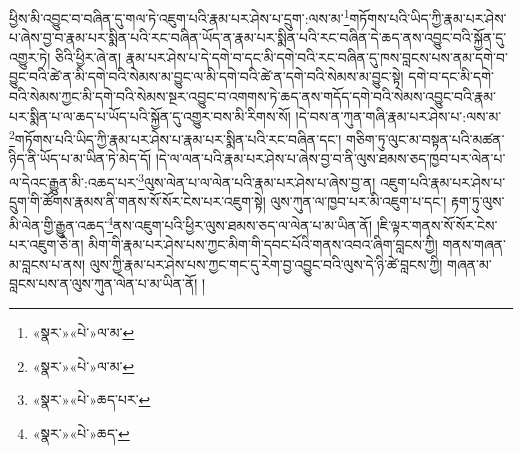 ཕྱིས་མི་འབྱུང་བ་བཞིན་དུ་གལ་ཏེ་འཇུག་པའི་རྣམ་པར་ཤེས་པ་དྲུག་:ལས་མ་\footnote{«སྣར་»«པེ་»ལ་མ་}གཏོགས་པའི་ཡིད་ཀྱི་རྣམ་པར་ཤེས་པ་ཞེས་བྱ་བ་རྣམ་པར་སྨིན་པའི་རང་བཞིན་ཡོད་ན་རྣམ་པར་སྨིན་པའི་རང་བཞིན་དེ་ཆད་ནས་འབྱུང་བའི་སྐྱོན་དུ་འགྱུར་ཏེ། ཅིའི་ཕྱིར་ཞེ་ན། རྣམ་པར་ཤེས་པ་དེ་དགེ་བ་དང་མི་དགེ་བའི་རང་བཞིན་དུ་ཁས་བླངས་པས་ནམ་དགེ་བ་བྱུང་བའི་ཚེ་ན་མི་དགེ་བའི་སེམས་མ་བྱུང་ལ་མི་དགེ་བའི་ཚེ་ན་དགེ་བའི་སེམས་མ་བྱུང་སྟེ། དགེ་བ་དང་མི་དགེ་བའི་སེམས་ཀྱང་མི་དགེ་བའི་སེམས་སྔར་འབྱུང་བ་འགགས་ཏེ་ཆད་ནས་གདོད་དགེ་བའི་སེམས་འབྱུང་བའི་རྣམ་པར་སྨིན་པ་ལ་ཆད་པ་ཡོད་པའི་སྐྱོན་དུ་འགྱུར་བས་མི་རིགས་སོ། །དེ་བས་ན་ཀུན་གཞི་རྣམ་པར་ཤེས་པ་:ལས་མ་\footnote{«སྣར་»«པེ་»ལ་མ་}གཏོགས་པའི་ཡིད་ཀྱི་རྣམ་པར་ཤེས་པ་རྣམ་པར་སྨིན་པའི་རང་བཞིན་དང་། གཅིག་ཏུ་ལུང་མ་བསྟན་པའི་མཚན་ཉིད་ནི་ཡོད་པ་མ་ཡིན་ཏེ་མེད་དོ། །དེ་ལ་ལན་པའི་རྣམ་པར་ཤེས་པ་ཞེས་བྱ་བ་ནི་ལུས་ཐམས་ཅད་ཁྱབ་པར་ལེན་པ་ལ་དེའང་རྒྱུན་མི་:འཆད་པར་\footnote{«སྣར་»«པེ་»ཆད་པར་}ལུས་ལེན་པ་ལ་ལེན་པའི་རྣམ་པར་ཤེས་པ་ཞེས་བྱ་ན། འཇུག་པའི་རྣམ་པར་ཤེས་པ་དྲུག་གི་ཚོགས་རྣམས་ནི་གནས་སོ་སོར་ངེས་པར་འཇུག་སྟེ། ལུས་ཀུན་ལ་ཁྱབ་པར་མི་འཇུག་པ་དང་། རྟག་ཏུ་ལུས་མི་ལེན་གྱི་རྒྱུན་འཆད་\footnote{«སྣར་»«པེ་»ཆད་}ནས་འཇུག་པའི་ཕྱིར་ལུས་ཐམས་ཅད་ལ་ལེན་པ་མ་ཡིན་ནོ། །ཇི་ལྟར་གནས་སོ་སོར་ངེས་པར་འཇུག་ཅེ་ན། མིག་གི་རྣམ་པར་ཤེས་པས་ཀྱང་མིག་གི་དབང་པོའི་གནས་འབའ་ཞིག་བླངས་ཀྱི། གནས་གཞན་མ་བླངས་པ་ནས། ལུས་ཀྱི་རྣམ་པར་ཤེས་པས་ཀྱང་གང་དུ་རེག་བྱ་འབྱུང་བའི་ལུས་དེ་ཉི་ཚེ་བླངས་ཀྱི། གཞན་མ་བླངས་པས་ན་ལུས་ཀུན་ལེན་པ་མ་ཡིན་ནོ། །

